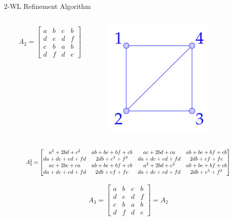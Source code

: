\documentclass{beamer}
\begin{document}
\addtocounter{framenumber}{-1}
\begin{frame}{2-WL Refinement Algorithm}
    \begin{columns}
        \begin{column}{0.7\textwidth}
        \begin{align*}
            A_2 = \begin{bmatrix}
                a&b&c&b\\
                d&e&d&f\\
                c&b&a&b\\
                d&f&d&e
            \end{bmatrix}
        \end{align*}
        \end{column}

        \begin{column}{0.3\textwidth}
            \centering
            \includegraphics[width=0.7\textwidth]{slides/pic_1.jpg}
        \end{column}
    \end{columns}
    
    \vspace{1em}
    \[
    \scalebox{0.8}{
    $
        A_2^2 = \begin{bmatrix}
            a^2+2bd+c^2 & ab+be+bf+cb&ac+2bd+ca & ab+be+bf+cb\\
            da+dc+ed+fd&2db+e^2+f^2&da+dc+ed+fd&2db+ef+fe\\
            ac+2bc+ca&ab+be+bf+cb&a^2+2bd+c^2&ab+be+bf+cb\\
            da+dc+ed+fd & 2db+ef+fe & da+dc+ed+fd & 2db+e^2+f^2
        \end{bmatrix}
    $
    }
    \]

    \vspace{1em}
    \begin{align*}
        A_3 = \begin{bmatrix}
            a&b&c&b\\
            d&e&d&f\\
            c&b&a&b\\
            d&f&d&e
        \end{bmatrix}=A_2
    \end{align*}
\end{frame}
\end{document}

